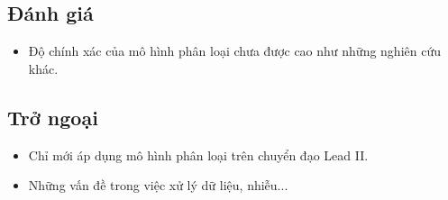 \subsection{Đánh giá}
\begin{itemize}
    \item Độ chính xác của mô hình phân loại chưa được cao như những nghiên cứu khác.
\end{itemize}
\subsection{Trở ngoại}
\begin{itemize}
    \item Chỉ mới áp dụng mô hình phân loại trên chuyển đạo Lead II.
    \item Những vấn đề trong việc xử lý dữ liệu, nhiễu...
\end{itemize}

